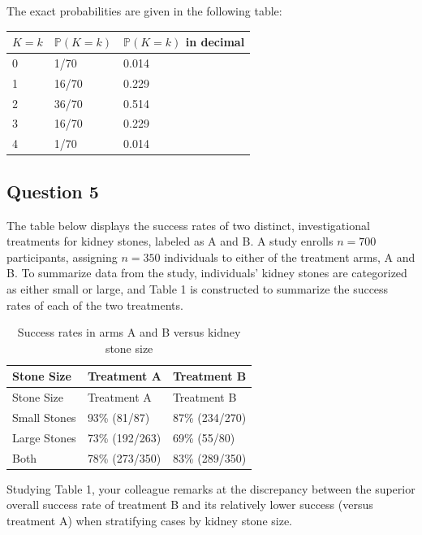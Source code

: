 \documentclass[
  letterpaper,
  DIV=11,
  numbers=noendperiod]{scrartcl}
\renewcommand{\P}{\mathbb{P}}
\begin{document}
The exact probabilities are given in the following table:

\begin{longtable}[]{@{}lll@{}}
\toprule()
\(K = k\) & \(\P(K = k)\) & \(\P(K = k)\) in decimal \\
\midrule()
\endhead
0 & 1/70 & 0.014 \\
1 & 16/70 & 0.229 \\
2 & 36/70 & 0.514 \\
3 & 16/70 & 0.229 \\
4 & 1/70 & 0.014 \\
\bottomrule()
\end{longtable}

\newpage

\hypertarget{question-5}{%
\subsection{Question 5}\label{question-5}}

The table below displays the success rates of two distinct,
investigational treatments for kidney stones, labeled as A and B. A
study enrolls \(n = 700\) participants, assigning \(n = 350\)
individuals to either of the treatment arms, A and B. To summarize data
from the study, individuals' kidney stones are categorized as either
small or large, and Table 1 is constructed to summarize the success
rates of each of the two treatments.

\begin{longtable}[]{@{}lll@{}}
\caption{Success rates in arms A and B versus kidney stone
size}\tabularnewline
\toprule()
Stone Size & Treatment A & Treatment B \\
\midrule()
\endfirsthead
\toprule()
Stone Size & Treatment A & Treatment B \\
\midrule()
\endhead
Small Stones & 93\% (81/87) & 87\% (234/270) \\
Large Stones & 73\% (192/263) & 69\% (55/80) \\
Both & 78\% (273/350) & 83\% (289/350) \\
\bottomrule()
\end{longtable}

Studying Table 1, your colleague remarks at the discrepancy between the
superior overall success rate of treatment B and its relatively lower
success (versus treatment A) when stratifying cases by kidney stone
size.
\end{document}
